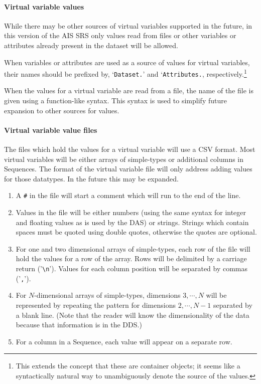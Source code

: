 \documentclass{article}
\begin{document}
\paragraph{Virtual variable values}
\label{sec:virtual-var-vals}
\cbstart While there may be other sources of virtual variables supported in
the future, in this version of the \ac{AIS} SRS only values read from files
or other variables or attributes already present in the dataset will be
allowed.

When variables or attributes are used as a source of values for virtual
variables, their names should be prefixed by, `\texttt{Dataset.}' and
`\texttt{Attributes.}, respectively.\footnote{This extends the concept that
  these are container objects; it seems like a syntactically natural way to
  unambiguously denote the source of the values.}

When the values for a virtual variable are read from a file, the name of the
file is given using a function-like syntax. This syntax is used to simplify
future expansion to other sources for values.

\paragraph{Virtual variable value files}
\label{sec:virtual-var-val-files}
The files which hold the values for a virtual variable will use a CSV
format. Most virtual variables will be either arrays of simple-types or
additional columns in Sequences. The format of the virtual variable file will
only address adding values for those datatypes. In the future this may be
expanded. 
\begin{enumerate}
\item A \texttt{\#} in the file will start a comment which will run to the end
  of the line.
\item Values in the file will be either numbers (using the same syntax for
  integer and floating values as is used by the DAS) or strings. Strings
  which contain spaces must be quoted using double quotes, otherwise the
  quotes are optional.
\item For one and two dimensional arrays of simple-types, each row of the
  file will hold the values for a row of the array. Rows will be delimited by
  a carriage return ('\verb+\n+'). Values for each column position will be
  separated by commas ('\texttt{,}').
\item For $N$-dimensional arrays of simple-types, dimensions $3, \cdots, N$
  will be represented by repeating the pattern for dimensions $2, \cdots, N-1$
  separated by a blank line. (Note that the reader will know the
  dimensionality of the data because that information is in the DDS.)
\item For a column in a Sequence, each value will appear on a separate row.
\end{enumerate}
\cbend
\end{document}
